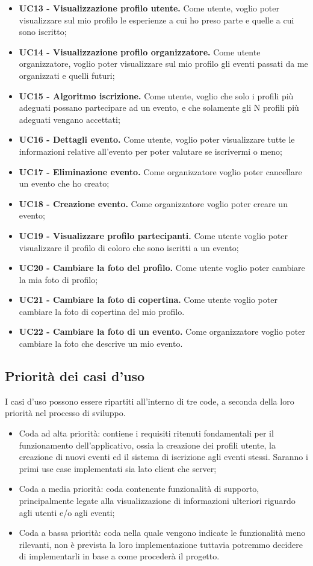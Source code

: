 \begin{itemize}
    \item \textbf{UC13 - Visualizzazione profilo utente.} Come utente, voglio poter visualizzare sul mio profilo le esperienze a cui ho preso parte e quelle a cui sono iscritto;
    \item \textbf{UC14 - Visualizzazione profilo organizzatore.} Come utente organizzatore, voglio poter visualizzare sul mio profilo gli eventi passati da me organizzati e quelli futuri;
    \item \textbf{UC15 - Algoritmo iscrizione.} Come utente, voglio che solo i profili più adeguati possano partecipare ad un evento, e che solamente gli N profili più adeguati vengano accettati;
    \item \textbf{UC16 - Dettagli evento.} Come utente, voglio poter visualizzare tutte le informazioni relative all’evento per poter valutare se iscrivermi o meno;
    \item \textbf{UC17 - Eliminazione evento.} Come organizzatore voglio poter cancellare un evento che ho creato;
    \item \textbf{UC18 - Creazione evento.} Come organizzatore voglio poter creare un evento;
    \item \textbf{UC19 - Visualizzare profilo partecipanti.} Come utente voglio poter visualizzare il profilo di coloro che sono iscritti a un evento;
    \item \textbf{UC20 - Cambiare la foto del profilo.} Come utente voglio poter cambiare la mia foto di profilo;
    \item \textbf{UC21 - Cambiare la foto di copertina.} Come utente voglio poter cambiare la foto di copertina del mio profilo.
    \item \textbf{UC22 - Cambiare la foto di un evento.} Come organizzatore voglio poter cambiare la foto che descrive un mio evento.
\end{itemize}
\clearpage

\subsection{Priorità dei casi d'uso}

I casi d'uso possono essere ripartiti all'interno di tre code, a seconda della loro priorità nel processo di sviluppo.
\begin{itemize}
    \item Coda ad alta priorità: contiene i requisiti ritenuti fondamentali per il funzionamento dell'applicativo, ossia la creazione dei profili utente, la creazione di nuovi eventi ed il sistema di iscrizione agli eventi stessi. Saranno i primi use case implementati sia lato client che server;
    \item Coda a media priorità: coda contenente funzionalità di supporto, principalmente legate alla visualizzazione di informazioni ulteriori riguardo agli utenti e/o agli eventi;
    \item Coda a bassa priorità: coda nella quale vengono indicate le funzionalità meno rilevanti, non è prevista la loro implementazione tuttavia potremmo decidere di implementarli in base a come procederà il progetto.
\end{itemize}

